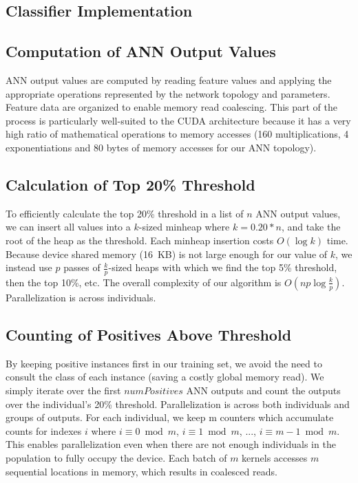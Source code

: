 \documentclass[11pt]{article}       %
\begin{document}
\subsection{Classifier Implementation} \label{implementation}

\subsection{Computation of ANN Output Values} \label{implementation}
ANN output values are computed by reading feature values and applying the appropriate operations represented by the network topology and parameters. Feature data are organized to enable memory read coalescing. This part of the process is particularly well-suited to the CUDA architecture because it has a very high ratio of mathematical operations to memory accesses (160 multiplications, 4 exponentiations and 80 bytes of memory accesses for our ANN topology).

\subsection{Calculation of Top 20\% Threshold} \label{implementation}
To efficiently calculate the top 20\% threshold in a list of $n$ ANN output values, we can insert all values into a $k$-sized minheap where $k = 0.20 * n$, and take the root of the heap as the threshold. Each minheap insertion costs $O(\log k)$ time. Because device shared memory (16~KB) is not large enough for our value of $k$, we instead use $p$ passes of $\frac{k}{p}$-sized heaps with which we find the top 5\% threshold, then the top 10\%, etc. The overall complexity of our algorithm is $O(np \log \frac{k}{p})$. Parallelization is across individuals.

\subsection{Counting of Positives Above Threshold} \label{implementation}
By keeping positive instances first in our training set, we avoid the need to consult the class of each instance (saving a costly global memory read). We simply iterate over the first $numPositives$ ANN outputs and count the outputs over the individual's 20\% threshold. Parallelization is across both individuals and groups of outputs. For each individual, we keep m counters which accumulate counts for indexes $i$ where $i \equiv 0 \bmod{m}$, $i \equiv 1 \bmod{m}$, ..., $i \equiv m - 1 \bmod{m}$. This enables parallelization even when there are not enough individuals in the population to fully occupy the device. Each batch of $m$ kernels accesses $m$ sequential locations in memory, which results in coalesced reads.
\end{document}
